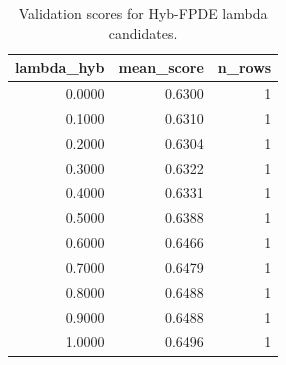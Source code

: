 \begin{table}[t]
\caption{Validation scores for Hyb-FPDE lambda candidates.}
\label{tab:lambda_distribution_computed}
\centering
\begin{tabular}{rrr}
\toprule
lambda\_hyb & mean\_score & n\_rows \\
\midrule
0.0000 & 0.6300 & 1 \\
0.1000 & 0.6310 & 1 \\
0.2000 & 0.6304 & 1 \\
0.3000 & 0.6322 & 1 \\
0.4000 & 0.6331 & 1 \\
0.5000 & 0.6388 & 1 \\
0.6000 & 0.6466 & 1 \\
0.7000 & 0.6479 & 1 \\
0.8000 & 0.6488 & 1 \\
0.9000 & 0.6488 & 1 \\
1.0000 & 0.6496 & 1 \\
\bottomrule
\end{tabular}

\end{table}
